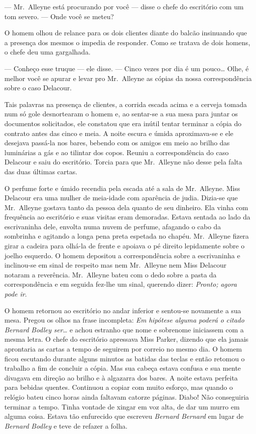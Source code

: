 --- Mr.~Alleyne está procurando por você --- disse o chefe do escritório com um
tom severo.  --- Onde você se meteu?

O homem olhou de relance para os dois clientes diante do balcão insinuando que
a presença dos mesmos o impedia de responder.  Como se tratava de dois homens,
o chefe deu uma gargalhada.

--- Conheço esse truque --- ele disse.  --- Cinco vezes por dia é um
pouco\ldots{} Olhe, é melhor você se apurar e levar pro Mr.~Alleyne as cópias
da nossa correspondência sobre o caso Delacour.

Tais palavras na presença de clientes, a corrida escada acima e a cerveja
tomada num só gole desnortearam o homem e, ao sentar-se a sua mesa para juntar
os documentos solicitados, ele constatou que era inútil tentar terminar a cópia
do contrato antes das cinco e meia.  A noite escura e úmida aproximava-se e ele
desejava passá-la nos bares, bebendo com os amigos em meio ao brilho das
luminárias a gás e ao tilintar dos copos.  Reuniu a correspondência do caso
Delacour e saiu do escritório.  Torcia para que Mr.~Alleyne não desse pela
falta das duas últimas cartas.

O perfume forte e úmido recendia pela escada até a sala de Mr.~Alleyne.  Miss
Delacour era uma mulher de meia-idade com aparência de judia.  Dizia-se que Mr.~Alleyne 
gostava tanto da pessoa dela quanto de seu dinheiro.  Ela vinha com
frequência ao escritório e suas visitas eram demoradas.  Estava sentada ao lado
da escrivaninha dele, envolta numa nuvem de perfume, afagando o cabo da
sombrinha e agitando a longa pena preta espetada no chapéu.  Mr.~Alleyne fizera
girar a cadeira para olhá-la de frente e apoiava o pé direito lepidamente sobre
o joelho esquerdo.  O homem depositou a correspondência sobre a escrivaninha e
inclinou-se em sinal de respeito mas nem Mr.~Alleyne nem Miss Delacour notaram
a reverência.  Mr.~Alleyne bateu com o dedo sobre a pasta da correspondência e
em seguida fez-lhe um sinal, querendo dizer: \textit{Pronto; agora pode
ir}.

O homem retornou ao escritório no andar inferior e sentou-se novamente a sua
mesa.  Pregou os olhos na frase incompleta: \textit{Em hipótese alguma poderá o
citado Bernard Bodley ser}\ldots{} e achou estranho que nome e sobrenome
iniciassem com a mesma letra.  O chefe do escritório apressava Miss Parker,
dizendo que ela jamais aprontaria as cartas a tempo de seguirem por correio no
mesmo dia.  O homem ficou escutando durante alguns minutos as batidas das
teclas e então retomou o trabalho a fim de concluir a cópia.  Mas sua cabeça
estava confusa e sua mente divagava em direção ao brilho e à algazarra dos
bares.  A noite estava perfeita para bebidas quentes.  Continuou a copiar com
muito esforço, mas quando o relógio bateu cinco horas ainda faltavam catorze
páginas.  Diabo!  Não conseguiria terminar a tempo.  Tinha vontade de xingar em
voz alta, de dar um murro em alguma coisa.  Estava tão enfurecido que escreveu
\textit{Bernard Bernard} em lugar de \textit{Bernard Bodley} e teve de
refazer a folha.

